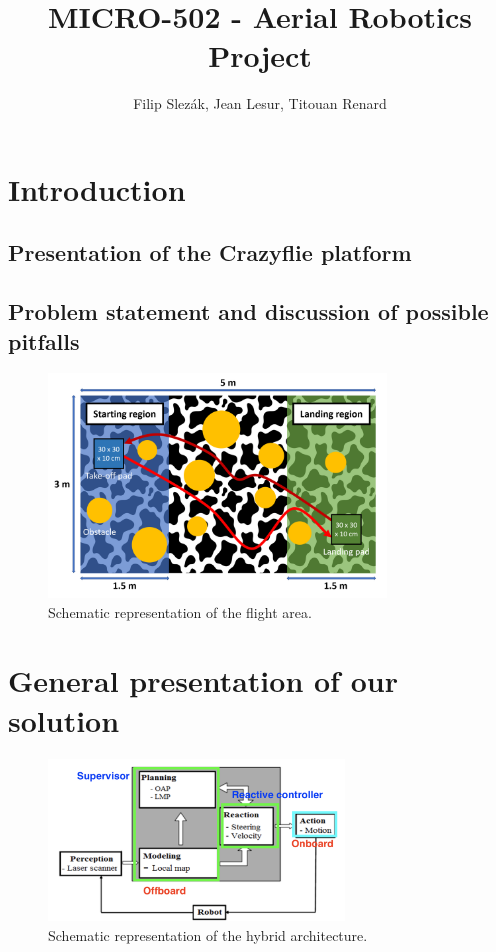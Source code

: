 \documentclass[11pt]{article}
\title{MICRO-502 - Aerial Robotics Project}
\author{Filip Slezák, Jean Lesur, Titouan Renard}
\begin{document}
\maketitle

\section{Introduction}



\subsection{Presentation of the Crazyflie platform}

\subsection{Problem statement and discussion of possible pitfalls}

\begin{figure}[h!]
    \centering
    \includegraphics[width=0.8\textwidth]{figures/crazyfly_objective_figure.png}
    \caption{Schematic representation of the flight area.}
\end{figure}

\section{General presentation of our solution}

\begin{figure}[h!]
    \centering
    \includegraphics[width=0.7\textwidth]{figures/arch_provisoire.png}
    \caption{Schematic representation of the hybrid architecture.}
\end{figure}
\end{document}
